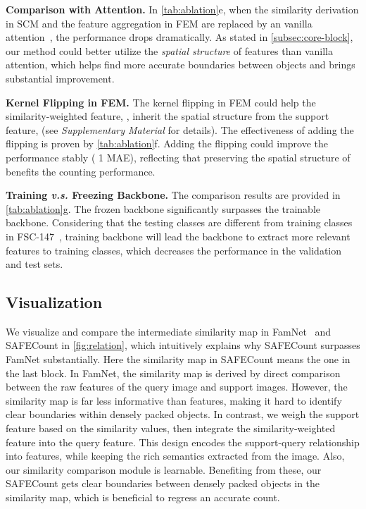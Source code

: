 \documentclass[10pt,twocolumn,letterpaper]{article}
\newcommand{\method}{SAFECount\xspace}
\newcommand{\supp}{\textit{Supplementary Material}\xspace}
\begin{document}
\noindent \textbf{Comparison with Attention.} In \cref{tab:ablation}e, when the similarity derivation in SCM and the feature aggregation in FEM are replaced by an vanilla attention~\cite{attention_need}, the performance drops dramatically. As stated in \cref{subsec:core-block}, our method could better utilize the \textit{spatial structure} of features than vanilla attention, which helps find more accurate boundaries between objects and brings substantial improvement. 


\noindent\textbf{Kernel Flipping in FEM.}
The kernel flipping in FEM could help the similarity-weighted feature, , inherit the spatial structure from the support feature,  (see \supp for details). 
The effectiveness of adding the flipping is proven by \cref{tab:ablation}f. 
Adding the flipping could improve the performance stably ( 1 MAE), reflecting that preserving the spatial structure of  benefits the counting performance. 


\vspace{2pt}\noindent\textbf{Training \textit{v.s.} Freezing Backbone.} The comparison results are provided in \cref{tab:ablation}g. The frozen backbone significantly surpasses the trainable backbone. Considering that the testing classes are different from training classes in FSC-147~\cite{famnet}, training backbone will lead the backbone to extract more relevant features to training classes, which decreases the performance in the validation and test sets. 








\subsection{Visualization}

We visualize and compare the intermediate similarity map in FamNet~\cite{famnet} and \method in \cref{fig:relation}, which intuitively explains why \method surpasses FamNet substantially. 
Here the similarity map in \method means the one in the last block. 
In FamNet, the similarity map is derived by direct comparison between the raw features of the query image and support images. 
However, the similarity map is far less informative than features, making it hard to identify clear boundaries within densely packed objects. 
In contrast, we weigh the support feature based on the similarity values, then integrate the similarity-weighted feature into the query feature. 
This design encodes the support-query relationship into features, while keeping the rich semantics extracted from the image. 
Also, our similarity comparison module is learnable. 
Benefiting from these, our \method gets clear boundaries between densely packed objects in the similarity map, which is beneficial to regress an accurate count. 
\end{document}
